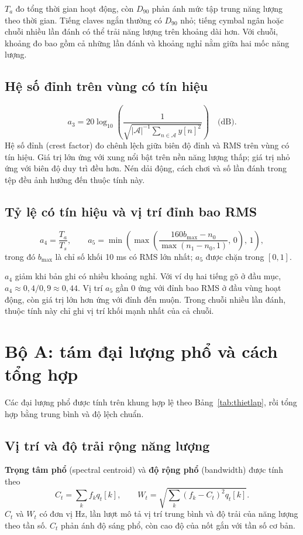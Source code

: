 \documentclass[11pt,a4paper]{article}
\begin{document}
$T_a$ đo tổng thời gian hoạt động, còn $D_{90}$ phản ánh mức tập trung năng lượng theo thời gian. Tiếng claves ngắn thường có $D_{90}$ nhỏ; tiếng cymbal ngân hoặc chuỗi nhiều lần đánh có thể trải năng lượng trên khoảng dài hơn. Với chuỗi, khoảng đo bao gồm cả những lần đánh và khoảng nghỉ nằm giữa hai mốc năng lượng.

\subsection{Hệ số đỉnh trên vùng có tín hiệu}
\[
a_3=20\log_{10}\left(\frac{1}{\sqrt{|\mathcal A|^{-1}\sum_{n\in\mathcal A}y[n]^2}}\right)\quad\text{(dB)}.
\]
Hệ số đỉnh (crest factor) đo chênh lệch giữa biên độ đỉnh và RMS trên vùng có tín hiệu. Giá trị lớn ứng với xung nổi bật trên nền năng lượng thấp; giá trị nhỏ ứng với biên độ duy trì đều hơn. Nén dải động, cách chơi và số lần đánh trong tệp đều ảnh hưởng đến thuộc tính này.

\subsection{Tỷ lệ có tín hiệu và vị trí đỉnh bao RMS}
\[
a_4=\frac{T_a}{T_s},\qquad
 a_5=\min\left(\max\left(\frac{160b_{\max}-n_0}{\max(n_1-n_0,1)},\,0\right),\,1\right),
\]
trong đó $b_{\max}$ là chỉ số khối 10 ms có RMS lớn nhất; $a_5$ được chặn trong $[0,1]$.

$a_4$ giảm khi bản ghi có nhiều khoảng nghỉ. Với ví dụ hai tiếng gõ ở đầu mục, $a_4\approx0{,}4/0{,}9\approx0{,}44$. Vị trí $a_5$ gần 0 ứng với đỉnh bao RMS ở đầu vùng hoạt động, còn giá trị lớn hơn ứng với đỉnh đến muộn. Trong chuỗi nhiều lần đánh, thuộc tính này chỉ ghi vị trí khối mạnh nhất của cả chuỗi.

\section{Bộ A: tám đại lượng phổ và cách tổng hợp}\label{sec:boA-pho}
Các đại lượng phổ được tính trên khung hợp lệ theo Bảng~\ref{tab:thietlap}, rồi tổng hợp bằng trung bình và độ lệch chuẩn.
\subsection{Vị trí và độ trải rộng năng lượng}
\textbf{Trọng tâm phổ} (spectral centroid) và \textbf{độ rộng phổ} (bandwidth) được tính theo
\[
C_t=\sum_k f_kq_t[k],\qquad W_t=\sqrt{\sum_k(f_k-C_t)^2q_t[k]}.
\]
$C_t$ và $W_t$ có đơn vị Hz, lần lượt mô tả vị trí trung bình và độ trải của năng lượng theo tần số. $C_t$ phản ánh độ sáng phổ, còn cao độ của nốt gắn với tần số cơ bản.
\end{document}
